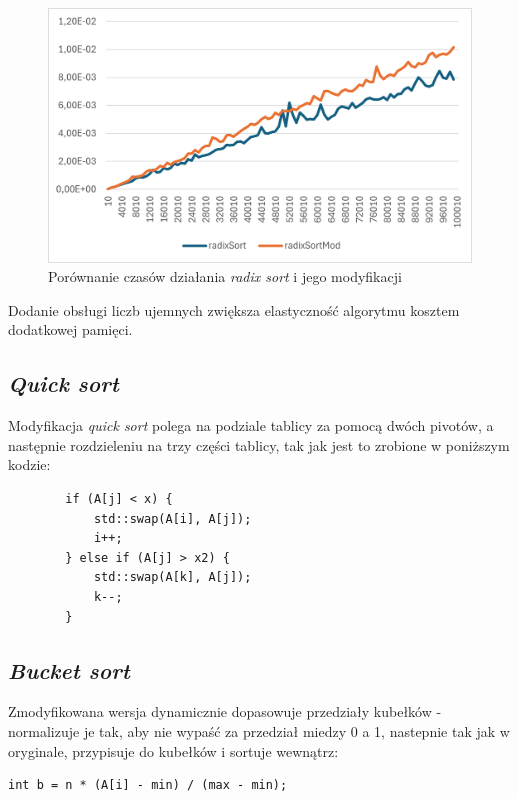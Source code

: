 \documentclass{article}
\begin{document}
	\begin{figure}[H]
		\centering
		\includegraphics[width=\textwidth]{radix.png}
		\caption{Porównanie czasów działania \textit{radix sort} i jego modyfikacji}
	\end{figure}
	
	Dodanie obsługi liczb ujemnych zwiększa elastyczność algorytmu kosztem dodatkowej pamięci.
	
	
	\subsection{\textit{Quick sort}}
	Modyfikacja \textit{quick sort} polega na podziale tablicy za pomocą dwóch pivotów, a następnie rozdzieleniu na trzy części tablicy, tak jak jest to zrobione w poniższym kodzie:
	\begin{lstlisting}
		if (A[j] < x) {
			std::swap(A[i], A[j]);
			i++;
		} else if (A[j] > x2) {
			std::swap(A[k], A[j]);
			k--;
		}
	\end{lstlisting}
	
	\subsection{\textit{Bucket sort}}
	Zmodyfikowana wersja dynamicznie dopasowuje przedziały kubełków - normalizuje je tak, aby nie wypaść za przedział miedzy 0 a 1, nastepnie tak jak w oryginale, przypisuje do kubełków i sortuje wewnątrz:
	
	\begin{lstlisting}
int b = n * (A[i] - min) / (max - min);
	\end{lstlisting}
	
\end{document}
